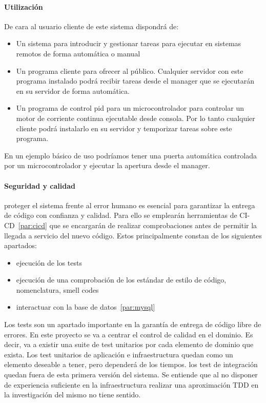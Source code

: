 \paragraph{Utilización}
    De cara al usuario cliente de este sistema dispondrá de:
    \begin{itemize}
        \item Un sistema para introducir y gestionar tareas para ejecutar en sistemas remotos de forma automática o manual
        \item Un programa cliente para ofrecer al público. Cualquier servidor con este programa instalado podrá recibir tareas desde el manager que se ejecutarán en su servidor de forma automática.
        \item Un programa de control pid para un microcontrolador para controlar un motor de corriente continua ejecutable desde consola. Por lo tanto cualquier cliente podrá instalarlo en su servidor y temporizar tareas sobre este programa.
    \end{itemize}

En un ejemplo básico de uso podríamos tener una puerta automática controlada por un microcontrolador y ejecutar la apertura desde el manager.

\paragraph{Seguridad y calidad}
proteger el sistema frente al error humano es esencial para garantizar la entrega de código con confianza y calidad. Para ello se emplearán herramientas de CI-CD~\ref{par:cicd} que se encargarán de realizar comprobaciones antes de permitir la llegada a servicio del nuevo código. Estos principalmente constan de los siguientes apartados:

\begin{itemize}
    \item ejecución de los tests
    \item ejecución de una comprobación de los estándar de estilo de código, nomenclatura, smell codes
    \item interactuar con la base de datos~\ref{par:mysql}
\end{itemize}

Los tests son un apartado importante en la garantía de entrega de código libre de errores. En este proyecto se va a centrar el control de calidad en el dominio. Es decir, va a existir una suite de test unitarios por cada elemento de dominio que exista. Los test unitarios de aplicación e infraestructura quedan como un elemento deseable a tener, pero dependerá de los tiempos. los test de integración quedan fuera de esta primera versión del sistema. Se entiende que al no disponer de experiencia suficiente en la infraestructura realizar una aproximación TDD en la investigación del mismo no tiene sentido.

